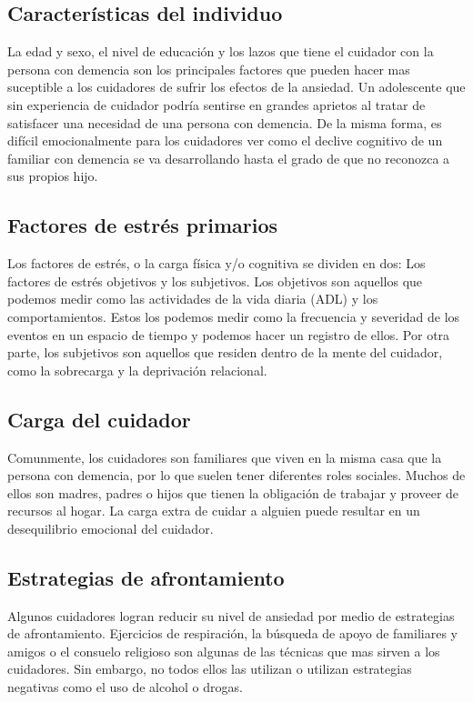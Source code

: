 	\subsection{Caracter\'isticas del individuo}{\label{secc:modeloAnsiedadCaregivers}}
		La edad y sexo, el nivel de educaci\'on y los lazos que tiene el cuidador con la persona con demencia son los principales factores que pueden hacer mas suceptible a los cuidadores de sufrir los efectos de la ansiedad. Un adolescente que sin experiencia de cuidador podr\'ia sentirse en grandes aprietos al tratar de satisfacer una necesidad de una persona con demencia. De la misma forma, es dif\'icil emocionalmente para los cuidadores ver como el declive cognitivo de un familiar con demencia se va desarrollando hasta el grado de que no reconozca a sus propios hijo.
	\subsection{Factores de estr\'es primarios}{\label{secc:modeloAnsiedadStressFactors}}
		Los factores de estr\'es, o la carga f\'isica y/o cognitiva se dividen en dos: Los factores de estr\'es objetivos y los subjetivos. Los objetivos son aquellos que podemos medir como las actividades de la vida diaria (ADL) y los comportamientos. Estos los podemos medir como la frecuencia y severidad de los eventos en un espacio de tiempo y podemos hacer un registro de ellos. Por otra parte, los subjetivos son aquellos que residen dentro de la mente del cuidador, como la sobrecarga y la deprivaci\'on relacional.
	\subsection{Carga del cuidador}{\label{secc:modeloAnsiedadSecondaryroles}}
		Comunmente, los cuidadores son familiares que viven en la misma casa que la persona con demencia, por lo que suelen tener diferentes roles sociales. Muchos de ellos son madres, padres o hijos que tienen la obligaci\'on de trabajar y proveer de recursos al hogar. La carga extra de cuidar a alguien puede resultar en un desequilibrio emocional del cuidador.
	
	\subsection{Estrategias de afrontamiento}{\label{secc:modeloAnsiedadCoping}}
	Algunos cuidadores logran reducir su nivel de ansiedad por medio de estrategias de afrontamiento. Ejercicios de respiraci\'on, la b\'usqueda de apoyo de familiares y amigos o el consuelo religioso \citep{Sharma20121287} son algunas de las t\'ecnicas que mas sirven a los cuidadores. Sin embargo, no todos ellos las utilizan o utilizan estrategias negativas como el uso de alcohol o drogas.

